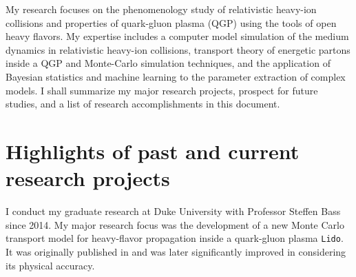\documentclass[12pt,a4paper]{article}
\begin{document}
My research focuses on the phenomenology study of relativistic heavy-ion collisions and properties of quark-gluon plasma (QGP) using the tools of open heavy flavors.
My expertise includes a computer model simulation of the medium dynamics in relativistic heavy-ion collisions, transport theory of energetic partons inside a QGP and Monte-Carlo simulation techniques, and the application of Bayesian statistics and machine learning to the parameter extraction of complex models.
I shall summarize my major research projects, prospect for future studies, and a list of research accomplishments in this document.


\section{Highlights of past and current research projects}
I conduct my graduate research at Duke University with Professor Steffen Bass since 2014.
My major research focus was the development of a new Monte Carlo transport model for heavy-flavor propagation inside a quark-gluon plasma {\tt Lido}. It was originally published in \cite{Ke:2018tsh} and was later significantly improved in \cite{Ke:2018jem} considering its physical accuracy.
\end{document}
